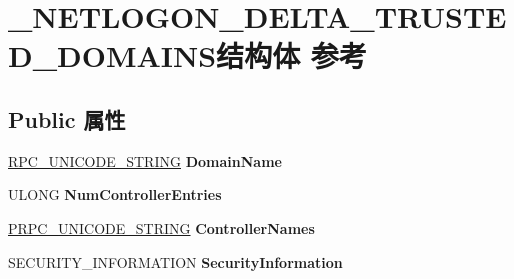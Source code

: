 \hypertarget{struct___n_e_t_l_o_g_o_n___d_e_l_t_a___t_r_u_s_t_e_d___d_o_m_a_i_n_s}{}\section{\+\_\+\+N\+E\+T\+L\+O\+G\+O\+N\+\_\+\+D\+E\+L\+T\+A\+\_\+\+T\+R\+U\+S\+T\+E\+D\+\_\+\+D\+O\+M\+A\+I\+N\+S结构体 参考}
\label{struct___n_e_t_l_o_g_o_n___d_e_l_t_a___t_r_u_s_t_e_d___d_o_m_a_i_n_s}
\subsection*{Public 属性}
\begin{DoxyCompactItemize}
\item 
\mbox{\label{struct___n_e_t_l_o_g_o_n___d_e_l_t_a___t_r_u_s_t_e_d___d_o_m_a_i_n_s_a6a42198ac088d87384677fc24ca3e428}} 
\hyperlink{struct___r_p_c___u_n_i_c_o_d_e___s_t_r_i_n_g}{R\+P\+C\+\_\+\+U\+N\+I\+C\+O\+D\+E\+\_\+\+S\+T\+R\+I\+NG} {\bfseries Domain\+Name}
\item 
\mbox{\label{struct___n_e_t_l_o_g_o_n___d_e_l_t_a___t_r_u_s_t_e_d___d_o_m_a_i_n_s_afb9251829475bab7c25069bac0bbd5fa}} 
U\+L\+O\+NG {\bfseries Num\+Controller\+Entries}
\item 
\mbox{\label{struct___n_e_t_l_o_g_o_n___d_e_l_t_a___t_r_u_s_t_e_d___d_o_m_a_i_n_s_a98aa59bc02eb43cf2501e8046ca24108}} 
\hyperlink{struct___r_p_c___u_n_i_c_o_d_e___s_t_r_i_n_g}{P\+R\+P\+C\+\_\+\+U\+N\+I\+C\+O\+D\+E\+\_\+\+S\+T\+R\+I\+NG} {\bfseries Controller\+Names}
\item 
\mbox{\label{struct___n_e_t_l_o_g_o_n___d_e_l_t_a___t_r_u_s_t_e_d___d_o_m_a_i_n_s_a1f5a28014c6335b00c789953a076c22f}} 
S\+E\+C\+U\+R\+I\+T\+Y\+\_\+\+I\+N\+F\+O\+R\+M\+A\+T\+I\+ON {\bfseries Security\+Information}
\item 
\mbox{\label{struct___n_e_t_l_o_g_o_n___d_e_l_t_a___t_r_u_s_t_e_d___d_o_m_a_i_n_s_a2c616ff0602ffc47190ec41c0a9ea28f}} 

\end{DoxyCompactItemize}
